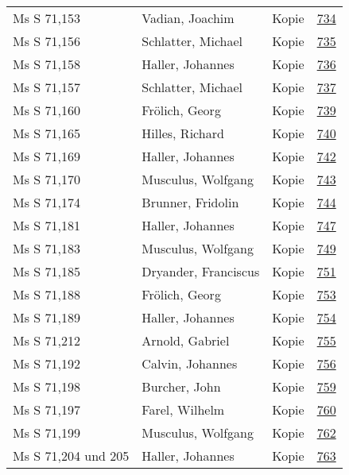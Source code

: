 \documentclass[10pt,a4paper,landscape]{report}
\begin{document}
\begin{longtable}{p{16cm}p{4cm}lr}
Ms S 71,153	&	Vadian, Joachim	&	Kopie	&	\href{http://130.60.24.72/assignment/734}{734}\\
Ms S 71,156	&	Schlatter, Michael	&	Kopie	&	\href{http://130.60.24.72/assignment/735}{735}\\
Ms S 71,158	&	Haller, Johannes	&	Kopie	&	\href{http://130.60.24.72/assignment/736}{736}\\
Ms S 71,157	&	Schlatter, Michael	&	Kopie	&	\href{http://130.60.24.72/assignment/737}{737}\\
Ms S 71,160	&	Frölich, Georg	&	Kopie	&	\href{http://130.60.24.72/assignment/739}{739}\\
Ms S 71,165	&	Hilles, Richard	&	Kopie	&	\href{http://130.60.24.72/assignment/740}{740}\\
Ms S 71,169	&	Haller, Johannes	&	Kopie	&	\href{http://130.60.24.72/assignment/742}{742}\\
Ms S 71,170	&	Musculus, Wolfgang	&	Kopie	&	\href{http://130.60.24.72/assignment/743}{743}\\
Ms S 71,174	&	Brunner, Fridolin	&	Kopie	&	\href{http://130.60.24.72/assignment/744}{744}\\
Ms S 71,181	&	Haller, Johannes	&	Kopie	&	\href{http://130.60.24.72/assignment/747}{747}\\
Ms S 71,183	&	Musculus, Wolfgang	&	Kopie	&	\href{http://130.60.24.72/assignment/749}{749}\\
Ms S 71,185	&	Dryander, Franciscus	&	Kopie	&	\href{http://130.60.24.72/assignment/751}{751}\\
Ms S 71,188	&	Frölich, Georg	&	Kopie	&	\href{http://130.60.24.72/assignment/753}{753}\\
Ms S 71,189	&	Haller, Johannes	&	Kopie	&	\href{http://130.60.24.72/assignment/754}{754}\\
Ms S 71,212	&	Arnold, Gabriel	&	Kopie	&	\href{http://130.60.24.72/assignment/755}{755}\\
Ms S 71,192	&	Calvin, Johannes	&	Kopie	&	\href{http://130.60.24.72/assignment/756}{756}\\
Ms S 71,198	&	Burcher, John	&	Kopie	&	\href{http://130.60.24.72/assignment/759}{759}\\
Ms S 71,197	&	Farel, Wilhelm	&	Kopie	&	\href{http://130.60.24.72/assignment/760}{760}\\
Ms S 71,199	&	Musculus, Wolfgang	&	Kopie	&	\href{http://130.60.24.72/assignment/762}{762}\\
Ms S 71,204 und 205	&	Haller, Johannes	&	Kopie	&	\href{http://130.60.24.72/assignment/763}{763}\\

\end{longtable}
\end{document}

